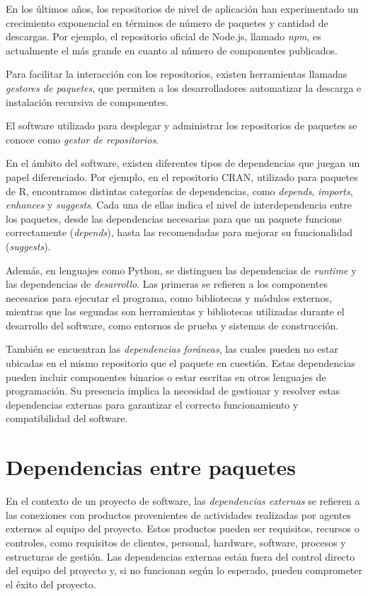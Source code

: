 En los últimos años, los repositorios de nivel de aplicación han experimentado un crecimiento exponencial
en términos de número de paquetes y cantidad de descargas. Por ejemplo, el repositorio oficial de
Node.js, llamado \textit{npm}, es actualmente el más grande en cuanto al número de componentes
publicados.

Para facilitar la interacción con los repositorios, existen herramientas llamadas \textit{gestores de
    paquetes}, que permiten a los desarrolladores automatizar la descarga e instalación recursiva de
componentes.

El software utilizado para desplegar y administrar los repositorios de paquetes se conoce como
\textit{gestor de repositorios}.


En el ámbito del software, existen diferentes tipos de dependencias que juegan un papel diferenciado. 
Por ejemplo, en el repositorio CRAN, utilizado para paquetes de R, encontramos distintas categorías 
de dependencias, como \textit{depends}, \textit{imports}, \textit{enhances} y \textit{suggests}. Cada una de ellas indica el nivel 
de interdependencia entre los paquetes, desde las dependencias necesarias para que un paquete funcione 
correctamente (\textit{depends}), hasta las recomendadas para mejorar su funcionalidad (\textit{suggests}).

Además, en lenguajes como Python, se distinguen las dependencias de \textit{runtime} y las dependencias de 
\textit{desarrollo}. Las primeras se refieren a los componentes necesarios para ejecutar el programa, como 
bibliotecas y módulos externos, mientras que las segundas son herramientas y bibliotecas utilizadas 
durante el desarrollo del software, como entornos de prueba y sistemas de construcción.

También se encuentran las \textit{dependencias foráneas}, las cuales pueden no estar ubicadas en el mismo 
repositorio que el paquete en cuestión. Estas dependencias pueden incluir componentes binarios o 
estar escritas en otros lenguajes de programación. Su presencia implica la necesidad de gestionar 
y resolver estas dependencias externas para garantizar el correcto funcionamiento y compatibilidad
 del software.


\section{Dependencias entre paquetes}

En el contexto de un proyecto de software, las \textit{dependencias externas} se refieren a las
conexiones con productos provenientes de actividades realizadas por agentes externos al equipo
del proyecto. Estos productos pueden ser requisitos, recursos o controles, como requisitos de clientes,
personal, hardware, software, procesos y estructuras de gestión.
Las dependencias externas están fuera del control directo del equipo del proyecto y, si no funcionan
según lo esperado, pueden comprometer el éxito del proyecto.

